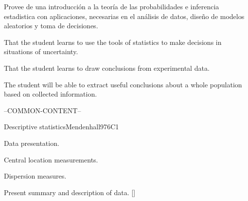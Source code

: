 
\begin{syllabus}


\begin{justification}
   Provee de una introducción a la teoría de las probabilidades e inferencia estadistica  con aplicaciones, necesarias en el análisis de datos, diseño de modelos aleatorios y toma de decisiones.
\end{justification}

\begin{goals}
\item That the student learns to use the tools of statistics to make decisions in situations of uncertainty.
\item That the student learns to draw conclusions from experimental data.
\item The student will be able to extract useful conclusions about a whole population based on collected information.
\end{goals}

--COMMON-CONTENT--

\begin{unit}{}{Descriptive statistics}{Mendenhall97}{6}{C1}
\begin{topics}
      \item Data presentation.
      \item Central location measurements.
      \item Dispersion measures.
   \end{topics}

   \begin{learningoutcomes}
      \item Present summary and description of data. [\Usage]
   \end{learningoutcomes}
\end{unit}


\end{syllabus}
